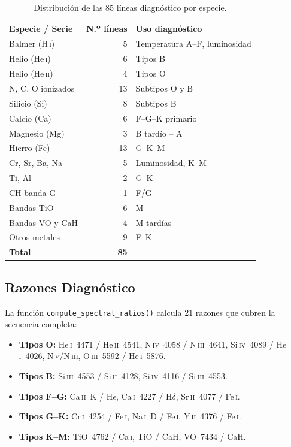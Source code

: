 \documentclass[12pt,a4paper]{article}
\begin{document}
\begin{table}[H]
  \centering
  \caption{Distribución de las 85 líneas diagnóstico por especie.}
  \label{tab:lineas}
  \renewcommand{\arraystretch}{1.2}
  \begin{tabular}{lrl}
    \toprule
    \textbf{Especie / Serie} & \textbf{N.º líneas} & \textbf{Uso diagnóstico} \\
    \midrule
    Balmer (H\,\textsc{i}) & 5 & Temperatura A--F, luminosidad \\
    Helio (He\,\textsc{i}) & 6 & Tipos B \\
    Helio (He\,\textsc{ii}) & 4 & Tipos O \\
    N, C, O ionizados & 13 & Subtipos O y B \\
    Silicio (Si) & 8 & Subtipos B \\
    Calcio (Ca) & 6 & F--G--K primario \\
    Magnesio (Mg) & 3 & B tardío -- A \\
    Hierro (Fe) & 13 & G--K--M \\
    Cr, Sr, Ba, Na & 5 & Luminosidad, K--M \\
    Ti, Al & 2 & G--K \\
    CH banda G & 1 & F/G \\
    Bandas TiO & 6 & M \\
    Bandas VO y CaH & 4 & M tardías \\
    Otros metales & 9 & F--K \\
    \midrule
    \textbf{Total} & \textbf{85} & \\
    \bottomrule
  \end{tabular}
\end{table}

\subsection{Razones Diagnóstico}

La función \texttt{compute\_spectral\_ratios()} calcula 21 razones que cubren la
secuencia completa:
\begin{itemize}
  \item \textbf{Tipos O:} He\,\textsc{i}~4471 / He\,\textsc{ii}~4541,
        N\,\textsc{iv}~4058 / N\,\textsc{iii}~4641, Si\,\textsc{iv}~4089 /
        He\,\textsc{i}~4026, N\,\textsc{v}/N\,\textsc{iii},
        O\,\textsc{iii}~5592 / He\,\textsc{i}~5876.
  \item \textbf{Tipos B:} Si\,\textsc{iii}~4553 / Si\,\textsc{ii}~4128,
        Si\,\textsc{iv}~4116 / Si\,\textsc{iii}~4553.
  \item \textbf{Tipos F--G:} Ca\,\textsc{ii}~K / H$\epsilon$,
        Ca\,\textsc{i}~4227 / H$\delta$, Sr\,\textsc{ii}~4077 / Fe\,\textsc{i}.
  \item \textbf{Tipos G--K:} Cr\,\textsc{i}~4254 / Fe\,\textsc{i},
        Na\,\textsc{i}~D / Fe\,\textsc{i}, Y\,\textsc{ii}~4376 / Fe\,\textsc{i}.
  \item \textbf{Tipos K--M:} TiO~4762 / Ca\,\textsc{i},
        TiO / CaH, VO~7434 / CaH.
\end{itemize}
\end{document}
